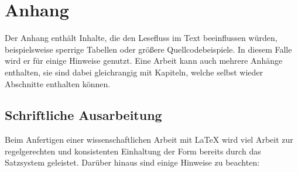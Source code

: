 \section{Anhang}


Der Anhang enthält Inhalte, die den Lesefluss im Text beeinflussen würden, beispielsweise sperrige Tabellen oder größere Quellcodebeispiele. In diesem Falle wird er für einige Hinweise genutzt. Eine Arbeit kann auch mehrere Anhänge enthalten, sie sind dabei gleichrangig mit Kapiteln, welche selbst wieder Abschnitte enthalten können.

\subsection{Schriftliche Ausarbeitung}
Beim Anfertigen einer wissenschaftlichen Arbeit mit \LaTeX{} wird viel Arbeit zur regelgerechten und konsistenten Einhaltung der Form bereits durch das Satzsystem geleistet. Darüber hinaus sind einige Hinweise zu beachten:
